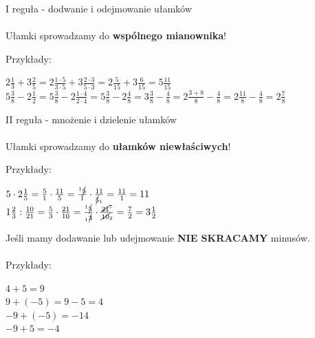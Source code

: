 \documentclass[12pt,a4paper]{article}
\begin{document}
	\begin{mdframed}[style=wzor]
	\large I reguła - dodwanie i odejmowanie ułamków
	\\\\\normalsize 
	Ułamki sprowadzamy do \textbf{wspólnego mianownika}!
	
	Przykłady:
	
	$2\frac{1}{3} + 3 \frac{2}{5} = 2\frac{1\cdot5}{3\cdot5} + 3 \frac{2\cdot3}{5\cdot3} = 2\frac{5}{15} + 3 \frac{6}{15} = 5\frac{11}{15}$\\

	$5\frac{3}{8} - 2 \frac{1}{2} = 5\frac{3}{8} - 2 \frac{1\cdot4}{2\cdot4} = 5\frac{3}{8} - 2 \frac{4}{8} = 3\frac{3}{8}-\frac{4}{8} = 2\frac{3+8}{8} - \frac{4}{8} = 2\frac{11}{8} - \frac{4}{8} = 2\frac{7}{8}$
	
	\end{mdframed}
	
	\begin{mdframed}[style=wzor]
	\large II reguła - mnożenie i dzielenie ułamków
	\\\\\normalsize
	Ułamki sprowadzamy do \textbf{ułamków niewłaściwych}!
	
	Przykłady:
	
	$5\cdot 2\frac{1}{5} = \frac{5}{1}\cdot\frac{11}{5}= \frac{{}^1 \cancel{5}}{1}\cdot\frac{11}{\cancel{5}_1}= \frac{11}{1} = 11$\\
	
	$1\frac{2}{3}:\frac{10}{21} = \frac{5}{3}\cdot \frac{21}{10} = \frac{{}^1\cancel{5}}{{}_1\cancel{3}}\cdot \frac{\cancel{21}^7}{\cancel{10}_2} = \frac{7}{2} = 3\frac{1}{2}$
	
	\end{mdframed}
	
	\vspace{1.5cm}
	
	\begin{mdframed}[style=wzor]
		\large Jeśli mamy dodawanie lub udejmowanie \textbf{NIE SKRACAMY} minusów.
		\\\\\normalsize
		Przykłady:
		
		$4 + 5 = 9$\\
		
		$9 + (-5) = 9 - 5 = 4$\\
		
		$-9 + (-5) = -14 $\\
		
		$-9 + 5 = -4$
		
	\end{mdframed}
	
\end{document}
